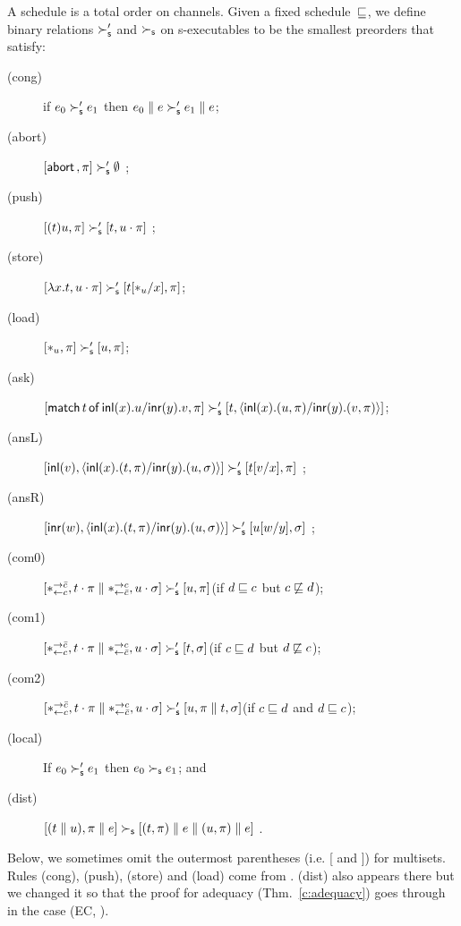 \documentclass[envcountsame]{llncs}
\begin{document}
A schedule is a total order on channels.
Given a fixed schedule~$\sqsubseteq$,
we define binary relations $\succ_{\mathsf s}'$ and $\succ_{\mathsf s}$
on s-executables
to be the smallest preorders
that satisfy:
\begin{description}
 \item[(cong)] if
      $e_0         \succ_{\mathsf s}' e_1$
      then
      $e_0 \parallel e \succ_{\mathsf s}' e_1\parallel e$\enspace;
 \item[(abort)] $[\mathsf{abort\,},\pi]\succ_{\mathsf s}' \emptyset$ \enspace;
 \item[(push)]
	    $[(t)u,\pi]      \succ_{\mathsf s}' [t,u\cdot\pi]$      \enspace;
 \item[(store)]
	    $[\lambda x.t,u\cdot\pi]
	     \succ_{\mathsf s}'
	     [t[\ast_u/x],      \pi]$\enspace;
 \item[(load)]
	    $[\ast_u,\pi]\succ_{\mathsf s}' [u,\pi]$\enspace;
 \item[(ask)]
      $[\mathsf{match}\,{t}\,\mathsf{of}\, \mathsf{inl}({x}). {u}/ \mathsf{inr}({y}). {v},\pi]\succ_{\mathsf s}' [t,\langle \mathsf{inl}({x}). ({u},{\pi})/ \mathsf{inr}({y}). ({v},{\pi})\rangle]$\enspace;
 \item[(ansL)]
           $[\mathsf{inl}({v}), \langle \mathsf{inl}({x}). ({t},{\pi})/ \mathsf{inr}({y}). ({u},{\sigma})\rangle] \succ_{\mathsf s}' [t[v/x],\pi] $ \enspace;
 \item[(ansR)]
           $[\mathsf{inr}({w}), \langle \mathsf{inl}({x}). ({t},{\pi})/ \mathsf{inr}({y}). ({u},{\sigma})\rangle] \succ_{\mathsf s}' [u[w/y],\sigma] $ \enspace;
 \item[(com0)]
           $[\ast^{\rightarrow {\bar{c}}}_{\leftarrow{c}}, t\cdot\pi\parallel \ast^{\rightarrow {c}}_{\leftarrow{\bar{c}}},
           u\cdot\sigma] \succ_{\mathsf s}'
           [u,\pi]$\enspace(if $d\sqsubseteq c$ but $c\not\sqsubseteq d$)\enspace;
 \item[(com1)]
	    $[\ast^{\rightarrow {\bar{c}}}_{\leftarrow{c}}, t\cdot\pi\parallel \ast^{\rightarrow {c}}_{\leftarrow{\bar{c}}},
	    u\cdot\sigma] \succ_{\mathsf s}'
	    [t,\sigma]$\enspace(if $c\sqsubseteq d$ but $d\not\sqsubseteq c$)\enspace;
 \item[(com2)]
	    $[\ast^{\rightarrow {\bar{c}}}_{\leftarrow{c}}, t\cdot\pi\parallel \ast^{\rightarrow {c}}_{\leftarrow{\bar{c}}},
	    u\cdot\sigma] \succ_{\mathsf s}'
	    [u,\pi\parallel t,\sigma]$\enspace(if $c\sqsubseteq d$ and $d\sqsubseteq
       c$)\enspace;
 \item[(local)] If $e_0\succ_{\mathsf s}'e_1$ then $e_0\succ_{\mathsf s} e_1$\enspace; and
 \item[(dist)]
           $[(t\parallel u),\pi\parallel e]  \succ_{\mathsf s} [(t,\pi)\parallel e\parallel (u,\pi)\parallel
      e]$ \enspace.
\end{description}
Below, we sometimes omit the outermost parentheses (i.e. [ and ]) for multisets.
Rules (cong), (push), (store) and (load) come from
\citet{danos-krivine}.  (dist) also appears there but we changed it so
that the proof for adequacy (Thm.~\ref{c:adequacy}) goes through in the
case (EC, \textminus).

\end{document}
